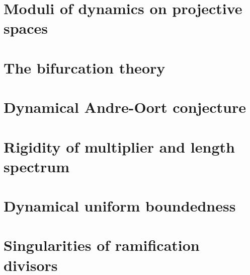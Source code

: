 \documentclass[sectionlevel=book,status=draft]{noteformyself}
\begin{document}
        \section[
          status=draft,
          tag=00000,
          label=\labelNFM{sec:endomorphisms-on-projective-spaces:moduli-of-dynamics-on-projective-spaces}
        ]{Moduli of dynamics on projective spaces}
        
        \section[
          status=draft,
          tag=00000,
          label=\labelNFM{sec:endomorphisms-on-projective-spaces:the-bifurcation-theory}
        ]{The bifurcation theory}
        
        \section[
          status=draft,
          tag=00000,
          label=\labelNFM{sec:endomorphisms-on-projective-spaces:dynamical-andre-oort-conjecture}
        ]{Dynamical Andre-Oort conjecture}
        
        \section[
          status=draft,
          tag=00000,
          label=\labelNFM{sec:endomorphisms-on-projective-spaces:rigidity-of-multiplier-and-length-spectrum}
        ]{Rigidity of multiplier and length spectrum}
        
        \section[
          status=draft,
          tag=00000,
          label=\labelNFM{sec:endomorphisms-on-projective-spaces:dynamical-uniform-boundedness}
        ]{Dynamical uniform boundedness}
        
        \section[
          status=draft,
          tag=00000,
          label=\labelNFM{sec:endomorphisms-on-projective-spaces:singularities-of-ramification-divisors}
        ]{Singularities of ramification divisors}
        
\end{document}
